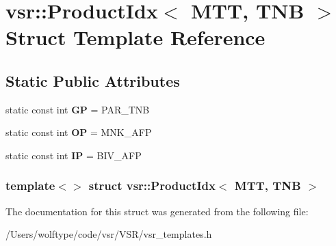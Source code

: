 \hypertarget{structvsr_1_1_product_idx_3_01_m_t_t_00_01_t_n_b_01_4}{\section{vsr\-:\-:Product\-Idx$<$ M\-T\-T, T\-N\-B $>$ Struct Template Reference}
\label{structvsr_1_1_product_idx_3_01_m_t_t_00_01_t_n_b_01_4}
}
\subsection*{Static Public Attributes}
\begin{DoxyCompactItemize}
\item 
\hypertarget{structvsr_1_1_product_idx_3_01_m_t_t_00_01_t_n_b_01_4_a2a596d59da691740a313b3999604174e}{static const int {\bfseries G\-P} = P\-A\-R\-\_\-\-T\-N\-B}\label{structvsr_1_1_product_idx_3_01_m_t_t_00_01_t_n_b_01_4_a2a596d59da691740a313b3999604174e}

\item 
\hypertarget{structvsr_1_1_product_idx_3_01_m_t_t_00_01_t_n_b_01_4_a0105efff1151f1863820ed3fda9c13fb}{static const int {\bfseries O\-P} = M\-N\-K\-\_\-\-A\-F\-P}\label{structvsr_1_1_product_idx_3_01_m_t_t_00_01_t_n_b_01_4_a0105efff1151f1863820ed3fda9c13fb}

\item 
\hypertarget{structvsr_1_1_product_idx_3_01_m_t_t_00_01_t_n_b_01_4_acf007be18303a308e7cd158f6ff9a4bd}{static const int {\bfseries I\-P} = B\-I\-V\-\_\-\-A\-F\-P}\label{structvsr_1_1_product_idx_3_01_m_t_t_00_01_t_n_b_01_4_acf007be18303a308e7cd158f6ff9a4bd}

\end{DoxyCompactItemize}
\subsubsection*{template$<$$>$ struct vsr\-::\-Product\-Idx$<$ M\-T\-T, T\-N\-B $>$}



The documentation for this struct was generated from the following file\-:\begin{DoxyCompactItemize}
\item 
/\-Users/wolftype/code/vsr/\-V\-S\-R/vsr\-\_\-templates.\-h\end{DoxyCompactItemize}
